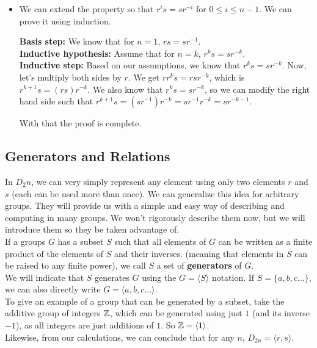 \documentclass[12pt]{article}
\begin{document}
\begin{itemize}[label=$\diamond$]
        \item
            We can extend the property so that $r^is = sr^{-i}$
            for $0 \leqslant i \leqslant n-1$.
            We can prove it using induction. \\
            \begin{adjustwidth}{1cm}{1cm}
                \textbf{Basis step:}
                We know that for $n = 1$,
                $rs = sr^{-1}$. \\
                \textbf{Inductive hypothesis:}
                Assume that for $n = k$,
                $r^ks = sr^{-k}$. \\
                \textbf{Inductive step:}
                Based on our assumptions,
                we know that $r^ks = sr^{-k}$.
                Now, let's multiply both sides by $r$.
                We get $rr^ks = rsr^{-k}$,
                which is $r^{k+1}s = (rs)r^{-k}$.
                We also know that $r^ks = sr^{-k}$,
                so we can modify the right hand side such that
                $r^{k+1}s = (sr^{-1})r^{-k} = sr^{-1}r^{-k} = sr^{-k-1}$.
            \end{adjustwidth}
            With that the proof is complete. \\
    \end{itemize}


    \subsection*{Generators and Relations}

    In $D_2n$, we can very simply represent any element
    using only two elements $r$ and $s$
    (each can be used more than once).
    We can generalize this idea for arbitrary groups.
    They will provide us with a simple and easy way of describing
    and computing in many groups.
    We won't rigorously describe them now,
    but we will introduce them so they be taken advantage of. \\

    If a groups $G$ has a subset $S$
    such that all elements of $G$ can be written as a finite
    product of the elements of $S$ and their inverses.
    (meaning that elements in $S$ can be raised to any finite power),
    we call $S$ a set of \textbf{generators} of $G$. \\
    We will indicate that $S$ generates $G$ using
    the $G = \langle S \rangle$ notation.
    If $S = \{a, b, c \dots\}$,
    we can also directly write $G = \langle a, b, c \dots \rangle$. \\
    To give an example of a group that can be generated by a subset,
    take the additive group of integers $\mathbb{Z}$,
    which can be generated using just $1$ (and its inverse $-1$),
    as all integers are just additions of $1$.
    So $\mathbb{Z} = \langle 1 \rangle$. \\
    Likewise, from our calculations,
    we can conclude that for any $n$, $D_{2n} = \langle r, s \rangle$. \\
\end{document}
